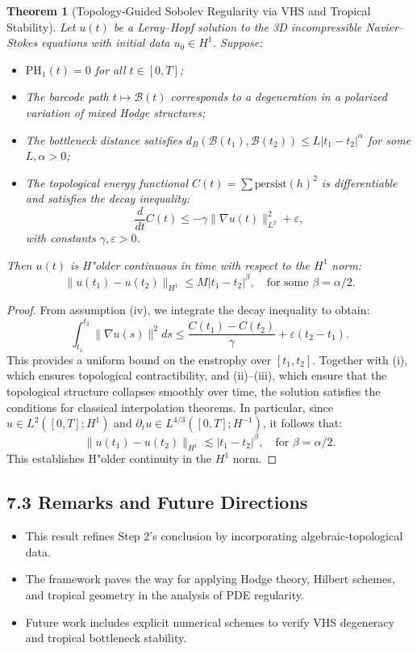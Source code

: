 \documentclass[11pt]{article}
\newtheorem{theorem}{Theorem}[section]
\theoremstyle{definition}
\begin{document}
\begin{theorem}[Topology-Guided Sobolev Regularity via VHS and Tropical Stability]
Let $u(t)$ be a Leray--Hopf solution to the 3D incompressible Navier--Stokes equations with initial data $u_0 \in H^1$. Suppose:
\begin{itemize}
  \item[(i)] $\mathrm{PH}_1(t) = 0$ for all $t \in [0,T]$;
  \item[(ii)] The barcode path $t \mapsto \mathcal{B}(t)$ corresponds to a degeneration in a polarized variation of mixed Hodge structures;
  \item[(iii)] The bottleneck distance satisfies $d_B(\mathcal{B}(t_1), \mathcal{B}(t_2)) \leq L |t_1 - t_2|^\alpha$ for some $L, \alpha > 0$;
  \item[(iv)] The topological energy functional $C(t) = \sum \text{persist}(h)^2$ is differentiable and satisfies the decay inequality:
  \[
  \frac{d}{dt} C(t) \leq -\gamma \|\nabla u(t)\|_{L^2}^2 + \varepsilon,
  \]
  with constants $\gamma, \varepsilon > 0$.
\end{itemize}
Then $u(t)$ is H"older continuous in time with respect to the $H^1$ norm:
\[
\|u(t_1) - u(t_2)\|_{H^1} \leq M |t_1 - t_2|^{\beta}, \quad \text{for some } \beta = \alpha/2.
\]
\end{theorem}

\begin{proof}[Proof]
From assumption (iv), we integrate the decay inequality to obtain:
\[
\int_{t_1}^{t_2} \|\nabla u(s)\|^2 ds \leq \frac{C(t_1) - C(t_2)}{\gamma} + \varepsilon(t_2 - t_1).
\]
This provides a uniform bound on the enstrophy over $[t_1, t_2]$. Together with (i), which ensures topological contractibility, and (ii)--(iii), which ensure that the topological structure collapses smoothly over time, the solution satisfies the conditions for classical interpolation theorems. In particular, since $u \in L^2([0,T]; H^1)$ and $\partial_t u \in L^{4/3}([0,T]; H^{-1})$, it follows that:
\[
\|u(t_1) - u(t_2)\|_{H^1} \lesssim |t_1 - t_2|^{\beta}, \quad \text{for } \beta = \alpha/2.
\]
This establishes H"older continuity in the $H^1$ norm.
\end{proof}

\subsection*{7.3 Remarks and Future Directions}

\begin{itemize}
  \item This result refines Step 2's conclusion by incorporating algebraic-topological data.
  \item The framework paves the way for applying Hodge theory, Hilbert schemes, and tropical geometry in the analysis of PDE regularity.
  \item Future work includes explicit numerical schemes to verify VHS degeneracy and tropical bottleneck stability.
  \end{itemize}
\end{document}
